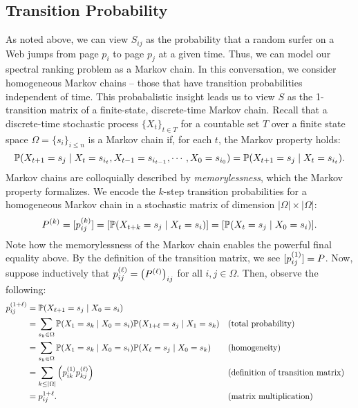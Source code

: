 \documentclass[../exploring-pagerank.tex]{subfiles}
\begin{document}
	\subsection{Transition Probability}
	As noted above, we can view $S_{ij}$ as the probability that a random surfer on a Web jumps from page $p_i$ to page $p_j$ at a given time. Thus, we can model our spectral ranking problem as a Markov chain. In this conversation, we consider homogeneous Markov chains -- those that have transition probabilities independent of time. This probabalistic insight leads us to view $S$ as the 1-transition matrix of a finite-state, discrete-time Markov chain. Recall that a discrete-time stochastic process $\{X_t\}_{t \in T}$ for a countable set $T$ over a finite state space $\Omega = \{s_i\}_{i\leq n}$ is a Markov chain if, for each $t$, the Markov property holds:
	\begin{equation*}
		\mathbb{P}(X_{t+1} = s_j \mid X_t = s_{i_t}, X_{t-1} = s_{i_{t-1}},\cdots, X_0 = s_{i_0}) = \mathbb{P}(X_{t+1} = s_j \mid X_t=s_{i_{t}}).
	\end{equation*}
	Markov chains are colloquially described by \textit{memorylessness}, which the Markov property formalizes. We encode the $k$-step transition probabilities for a homogeneous Markov chain in a stochastic matrix of dimension $|\Omega| \times |\Omega|$:
	\begin{equation}
		P^{(k)} = [ p^{(k)}_{ij} ] = [ \mathbb{P}(X_{t+k} = s_j \mid X_t = s_i) ] = [ \mathbb{P}(X_{t} = s_j \mid X_0 = s_i) ].
	\end{equation}
	Note how the memorylessness of the Markov chain enables the powerful final equality above. By the definition of the transition matrix, we see $ [ p^{(1)}_{ij} ] = P$. Now, suppose inductively that $p^{(\ell)}_{ij} = \left( P^{(\ell)} \right)_{ij}$ for all $i, j \in \Omega$. Then, observe the following:
	\begin{align*}
		p^{(1+\ell)}_{ij} &= \mathbb{P}(X_{\ell+1} = s_j \mid X_0 = s_i) \\
		&= \sum_{s_k\in\Omega}{\mathbb{P}(X_1 = s_k \mid X_0 = s_i) \mathbb{P}(X_{1+\ell} = s_j \mid X_1 = s_k)} && \text{(total probability)} \\
		&= \sum_{s_k\in\Omega}{\mathbb{P}(X_1 = s_k \mid X_0 = s_i) \mathbb{P}(X_{\ell} = s_j \mid X_0 = s_k)} && \text{(homogeneity)} \\
		&= \sum_{k\leq |\Omega|}{\left( p^{(1)}_{ik} p^{(\ell)}_{kj} \right)} && \text{(definition of transition matrix)}\\
		&= p^{1+\ell}_{ij}. && \text{(matrix multiplication)}
	\end{align*}
\end{document}
